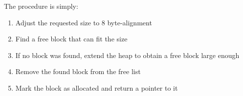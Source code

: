 The procedure is simply:

\begin{enumerate}
  \item Adjust the requested size to 8 byte-alignment
  \item Find a free block that can fit the size
  \item If no block was found, extend the heap to obtain a free block large enough
  \item Remove the found block from the free list
  \item Mark the block as allocated and return a pointer to it
\end{enumerate}

